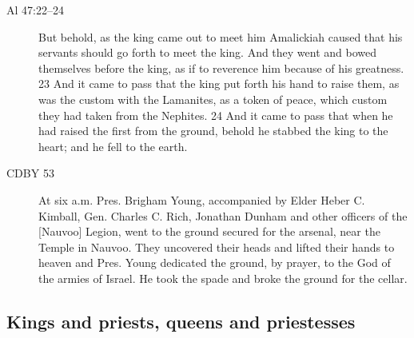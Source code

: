 \begin{description}
			\item[Al 47:22--24] But behold, as the king came out to meet him Amalickiah caused that his servants should go forth to meet the king. And they went and bowed themselves before the king, as if to reverence him because of his greatness. 23 And it came to pass that the king put forth his hand to raise them, as was the custom with the Lamanites, as a token of peace, which custom they had taken from the Nephites. 24 And it came to pass that when he had raised the first from the ground, behold he stabbed the king to the heart; and he fell to the earth.
			\item[CDBY 53] At six a.m. Pres. Brigham Young, accompanied by Elder Heber C. Kimball, Gen. Charles C. Rich, Jonathan Dunham and other officers of the [Nauvoo] Legion, went to the ground secured for the arsenal, near the Temple in Nauvoo. They uncovered their heads and lifted their hands to heaven and Pres. Young dedicated the ground, by prayer, to the God of the armies of Israel. He took the spade and broke the ground for the cellar.
			\end{description}
		
	\subsection{Kings and priests, queens and priestesses} %

